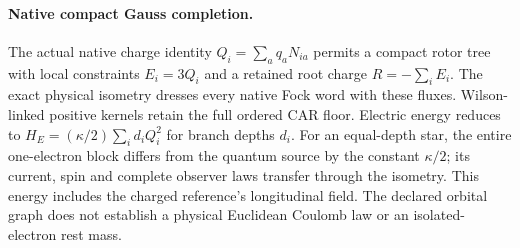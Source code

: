 \paragraph{Native compact Gauss completion.}
The actual native charge identity $Q_i=\sum_a q_aN_{ia}$ permits a compact
rotor tree with local constraints $E_i=3Q_i$ and a retained root charge
$R=-\sum_iE_i$. The exact physical isometry dresses every native Fock word
with these fluxes. Wilson-linked positive kernels retain the full ordered
CAR floor. Electric energy reduces to
$H_E=(\kappa/2)\sum_i d_iQ_i^2$ for branch depths $d_i$.
For an equal-depth star, the entire one-electron block differs from the
quantum source by the constant $\kappa/2$; its current, spin and complete
observer laws transfer through the isometry. This energy includes the charged
reference's longitudinal field. The declared orbital graph does not establish
a physical Euclidean Coulomb law or an isolated-electron rest mass.
